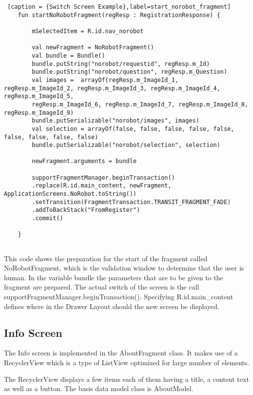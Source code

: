 \begin{lstlisting} [caption = {Switch Screen Example},label=start_norobot_fragment]
	fun startNoRobotFragment(regResp : RegistrationResponse) {
		
		mSelectedItem = R.id.nav_norobot  
		
		val newFragment = NoRobotFragment()
		val bundle = Bundle()
		bundle.putString("norobot/requestid", regResp.m_Id)
		bundle.putString("norobot/question", regResp.m_Question)
		val images =  arrayOf(regResp.m_ImageId_1, regResp.m_ImageId_2, regResp.m_ImageId_3, regResp.m_ImageId_4, regResp.m_ImageId_5,
		regResp.m_ImageId_6, regResp.m_ImageId_7, regResp.m_ImageId_8, regResp.m_ImageId_9)
		bundle.putSerializable("norobot/images", images)
		val selection = arrayOf(false, false, false, false, false, false, false, false, false)
		bundle.putSerializable("norobot/selection", selection)
		
		newFragment.arguments = bundle
		
		supportFragmentManager.beginTransaction()
		.replace(R.id.main_content, newFragment, ApplicationScreens.NoRobot.toString())
		.setTransition(FragmentTransaction.TRANSIT_FRAGMENT_FADE)
		.addToBackStack("FromRegister")
		.commit()
		
	}
	
\end{lstlisting}

This code shows the preparation for the start of the fragment called NoRobotFragment, which is the validation window to determine that the user is human. In the variable bundle the parameters that are to be given to the fragment are prepared. The actual switch of the screen is the call supportFragmentManager.beginTransaction(). Specifying R.id.main\_content defines where in the Drawer Layout should the new screen be displayed. 

\subsection {Info Screen} \label {info_screen}

The Info screen is implemented in the AboutFragment class. It makes use of a RecyclerView which is a type of ListView optimized for large number of elements.

The RecyclerView displays a few items each of them having a title, a content text as well as a button. The basis data model class is AboutModel.


